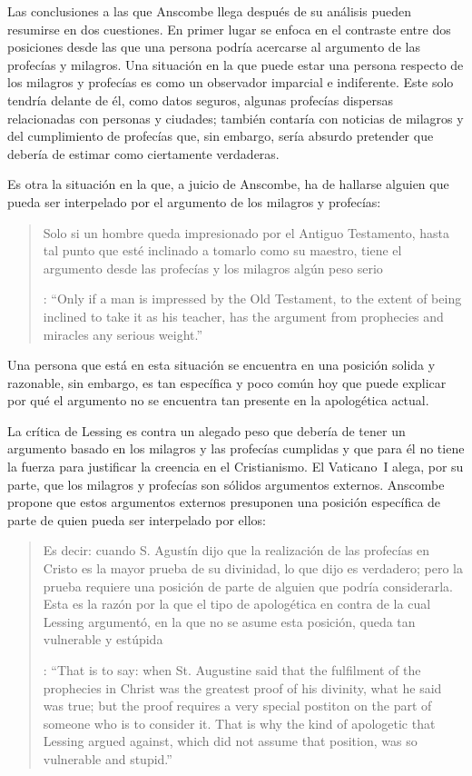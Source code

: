 Las conclusiones a las que Anscombe llega después de su análisis pueden resumirse en dos cuestiones. En primer lugar se enfoca en el contraste entre dos posiciones desde las que una persona podría acercarse al argumento de las profecías y milagros. Una situación en la que puede estar una persona respecto de los milagros y profecías es como un observador imparcial e indiferente. Este solo tendría delante de él, como datos seguros, algunas profecías dispersas relacionadas con personas y ciudades; también contaría con noticias de milagros y del cumplimiento de profecías que, sin embargo, sería absurdo pretender que debería de estimar como ciertamente verdaderas.

Es otra la situación en la que, a juicio de Anscombe, ha de hallarse alguien que pueda ser interpelado por el argumento de los milagros y profecías: \blockquote[{\cite[35]{anscombe2008faith:prophandmi}}: \enquote{Only if a man is impressed by the Old Testament, to the extent of being inclined to take it as his teacher, has the argument from prophecies and miracles any serious weight.}]{Solo si un hombre queda impresionado por el Antiguo Testamento, hasta tal punto que esté inclinado a tomarlo como su maestro, tiene el argumento desde las profecías y los milagros algún peso serio}. Una persona que está en esta situación se encuentra en una posición solida y razonable, sin embargo, es tan específica y poco común hoy que puede explicar por qué el argumento no se encuentra tan presente en la apologética actual.

La crítica de Lessing es contra un alegado peso que debería de tener un argumento basado en los milagros y las profecías cumplidas y que para él no tiene la fuerza para justificar la creencia en el Cristianismo. El Vaticano~I alega, por su parte, que los milagros y profecías son sólidos argumentos externos. Anscombe propone que estos argumentos externos presuponen una posición específica de parte de quien pueda ser interpelado por ellos: \blockquote[{\cite[37]{anscombe2008faith:prophandmi}}: \enquote{That is to say: when St. Augustine said that the fulfilment of the prophecies in Christ was the greatest proof of his divinity, what he said was true; but the proof requires a very special postiton on the part of someone who is to consider it. That is why the kind of apologetic that Lessing argued against, which did not assume that position, was so vulnerable and stupid.}]{Es decir: cuando S. Agustín dijo que la realización de las profecías en Cristo es la mayor prueba de su divinidad, lo que dijo es verdadero; pero la prueba requiere una posición de parte de alguien que podría considerarla. Esta es la razón por la que el tipo de apologética en contra de la cual Lessing argumentó, en la que no se asume esta posición, queda tan vulnerable y estúpida}.

